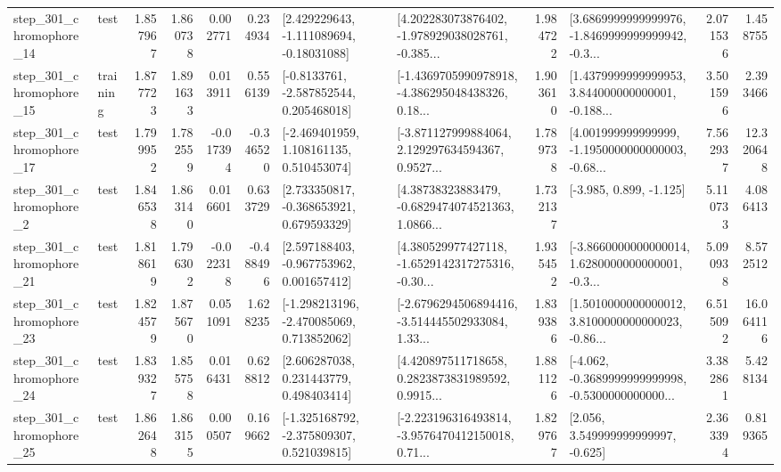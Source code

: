 \begin{tabular}{llrrrrllrlrr}
  step\_301\_chromophore\_14 &      test &      1.857967 &    1.860738 &      0.002771 &  0.234934 &    [2.429229643, -1.111089694, -0.18031088] &  [4.202283073876402, -1.978929038028761, -0.385... &       1.984722 &  [3.6869999999999976, -1.8469999999999942, -0.3... &            2.071536 &          1.458755 \\
  step\_301\_chromophore\_15 &  training &      1.877723 &    1.891633 &      0.013911 &  0.556139 &     [-0.8133761, -2.587852544, 0.205468018] &  [-1.4369705990978918, -4.386295048438326, 0.18... &       1.903610 &  [1.4379999999999953, 3.844000000000001, -0.188... &            3.501596 &          2.393466 \\
  step\_301\_chromophore\_17 &      test &      1.799952 &    1.782559 &     -0.017394 & -0.346520 &    [-2.469401959, 1.108161135, 0.510453074] &  [-3.871127999884064, 2.129297634594367, 0.9527... &       1.789738 &  [4.001999999999999, -1.1950000000000003, -0.68... &            7.562937 &         12.320648 \\
   step\_301\_chromophore\_2 &      test &      1.846538 &    1.863140 &      0.016601 &  0.633729 &    [2.733350817, -0.368653921, 0.679593329] &  [4.38738323883479, -0.6829474074521363, 1.0866... &       1.732137 &                            [-3.985, 0.899, -1.125] &            5.110733 &          4.086413 \\
  step\_301\_chromophore\_21 &      test &      1.818619 &    1.796302 &     -0.022318 & -0.488496 &    [2.597188403, -0.967753962, 0.001657412] &  [4.380529977427118, -1.6529142317275316, -0.30... &       1.935452 &  [-3.8660000000000014, 1.6280000000000001, -0.3... &            5.090938 &          8.572512 \\
  step\_301\_chromophore\_23 &      test &      1.824579 &    1.875670 &      0.051091 &  1.628235 &   [-1.298213196, -2.470085069, 0.713852062] &  [-2.6796294506894416, -3.514445502933084, 1.33... &       1.839386 &  [1.5010000000000012, 3.8100000000000023, -0.86... &            6.515092 &         16.064116 \\
  step\_301\_chromophore\_24 &      test &      1.839327 &    1.855758 &      0.016431 &  0.628812 &     [2.606287038, 0.231443779, 0.498403414] &  [4.420897511718658, 0.2823873831989592, 0.9915... &       1.881126 &  [-4.062, -0.3689999999999998, -0.5300000000000... &            3.382861 &          5.428134 \\
  step\_301\_chromophore\_25 &      test &      1.862648 &    1.863155 &      0.000507 &  0.169662 &   [-1.325168792, -2.375809307, 0.521039815] &  [-2.223196316493814, -3.9576470412150018, 0.71... &       1.829767 &                 [2.056, 3.549999999999997, -0.625] &            2.363394 &          0.819365 \\

\end{tabular}
